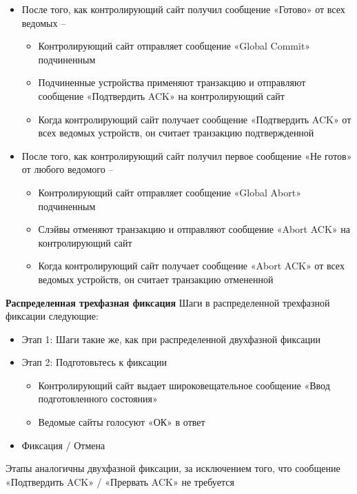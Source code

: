 \begin{itemize}
    \item После того, как контролирующий сайт получил сообщение «Готово» от всех ведомых –
    \begin{itemize}
        \item Контролирующий сайт отправляет сообщение «Global Commit» подчиненным
        \item Подчиненные устройства применяют транзакцию и отправляют сообщение «Подтвердить ACK» на контролирующий сайт
        \item Когда контролирующий сайт получает сообщение «Подтвердить ACK» от всех ведомых устройств, он считает транзакцию подтвержденной
    \end{itemize}
    \item После того, как контролирующий сайт получил первое сообщение «Не готов» от любого ведомого –
    \begin{itemize}
        \item Контролирующий сайт отправляет сообщение «Global Abort» подчиненным
        \item Слэйвы отменяют транзакцию и отправляют сообщение «Abort ACK» на контролирующий сайт
        \item Когда контролирующий сайт получает сообщение «Abort ACK» от всех ведомых устройств, он считает транзакцию отмененной
    \end{itemize}

\end{itemize}

\bigbreak
\textbf{Распределенная трехфазная фиксация}
Шаги в распределенной трехфазной фиксации следующие:
\begin{itemize}
    \item Этап 1: Шаги такие же, как при распределенной двухфазной фиксации
    \item Этап 2: Подготовьтесь к фиксации
    \begin{itemize}
        \item Контролирующий сайт выдает широковещательное сообщение «Ввод подготовленного состояния»
        \item Ведомые сайты голосуют «ОК» в ответ
    \end{itemize}
    \item Фиксация / Отмена
\end{itemize}

Этапы аналогичны двухфазной фиксации, за исключением того, что сообщение «Подтвердить ACK» / «Прервать ACK» не требуется

